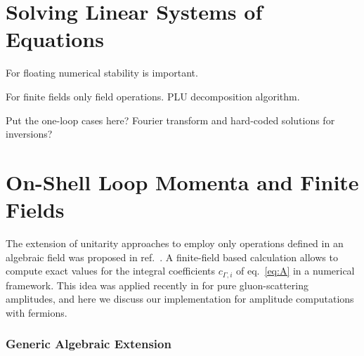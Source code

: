 \section{Solving Linear Systems of Equations}
For floating numerical stability is important.

For finite fields only field operations. PLU decomposition algorithm.

Put the one-loop cases here? Fourier transform and hard-coded solutions for inversions?

\section{On-Shell Loop Momenta and Finite Fields}
The extension of unitarity approaches to employ only operations
defined in an algebraic field was proposed 
in ref.~\cite{Peraro:2016wsq}.
A finite-field based calculation allows to compute exact values
for the integral coefficients $c_{\Gamma,i}$ of eq.~\eqref{eq:A}
in a numerical framework.
This idea
was applied recently in \cite{Badger:2017jhb,Abreu:2017hqn} for
pure gluon-scattering amplitudes, and here we discuss our
implementation for amplitude computations with fermions.

\subsubsection{Generic Algebraic Extension}


